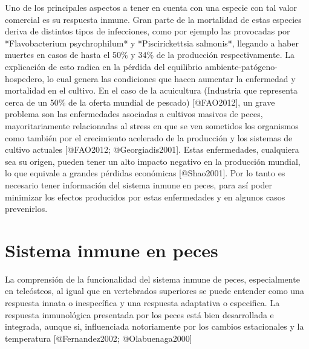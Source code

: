 Uno de los principales aspectos a tener en cuenta con una especie con tal valor comercial es su respuesta inmune. Gran parte de la mortalidad de estas especies deriva de distintos tipos de infecciones, como por ejemplo las provocadas por *Flavobacterium psychrophilum* y *Piscirickettsia salmonis*, llegando a haber muertes en casos de hasta el 50\% y 34\% de la producción respectivamente. La explicación de esto radica en la pérdida del equilibrio ambiente-patógeno-hospedero, lo cual genera las condiciones que hacen aumentar la enfermedad y mortalidad en el cultivo. En el caso de la acuicultura (Industria que representa cerca de un 50\% de la oferta mundial de pescado) [@FAO2012], un grave problema son las enfermedades asociadas a cultivos masivos de peces, mayoritariamente relacionadas al stress en que se ven sometidos los organismos como también por el crecimiento acelerado de la producción y los sistemas de cultivo actuales [@FAO2012; @Georgiadis2001]⁠⁠. Estas enfermedades, cualquiera sea su origen, pueden tener un alto impacto negativo en la producción mundial, lo que equivale a grandes pérdidas económicas [@Shao2001]⁠. Por lo tanto es necesario tener información del sistema inmune en peces, para así poder minimizar los efectos producidos por estas enfermedades y en algunos casos prevenirlos.


\section{Sistema inmune en peces}
La comprensión de la funcionalidad del sistema inmune de peces, especialmente en teleósteos, al igual que en vertebrados superiores se puede entender como una respuesta innata o inespecífica y una respuesta adaptativa o especifica. La respuesta inmunológica presentada por los peces está bien desarrollada e integrada, aunque si, influenciada notoriamente por los cambios estacionales y la temperatura [@Fernandez2002; @Olabuenaga2000]

